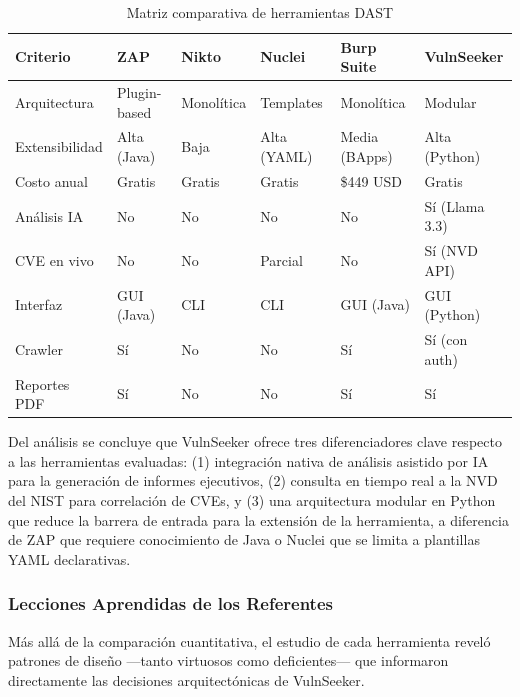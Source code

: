 \documentclass[12pt, a4paper]{article}
\begin{document}
\begin{table}[H]
    \centering
    \caption{Matriz comparativa de herramientas DAST}
    \label{tab:comparativa}
    \small
    \begin{tabular}{p{2.5cm} p{2cm} p{2cm} p{2cm} p{2cm} p{2.2cm}}
        \toprule
        \textbf{Criterio} & \textbf{ZAP} & \textbf{Nikto} & \textbf{Nuclei} &
        \textbf{Burp Suite} & \textbf{VulnSeeker} \\
        \midrule
        Arquitectura &
            Plugin-based & Monolítica & Templates & Monolítica &
            Modular \\
        Extensibilidad &
            Alta (Java) & Baja & Alta (YAML) & Media (BApps) &
            Alta (Python) \\
        Costo anual &
            Gratis & Gratis & Gratis & \$449 USD &
            Gratis \\
        Análisis IA &
            No & No & No & No &
            Sí (Llama 3.3) \\
        CVE en vivo &
            No & No & Parcial & No &
            Sí (NVD API) \\
        Interfaz &
            GUI (Java) & CLI & CLI & GUI (Java) &
            GUI (Python) \\
        Crawler &
            Sí & No & No & Sí &
            Sí (con auth) \\
        Reportes PDF &
            Sí & No & No & Sí &
            Sí \\
        \bottomrule
    \end{tabular}
\end{table}

Del análisis se concluye que VulnSeeker ofrece tres diferenciadores clave
respecto a las herramientas evaluadas: (1) integración nativa de análisis
asistido por IA para la generación de informes ejecutivos, (2) consulta en
tiempo real a la NVD del NIST para correlación de CVEs, y (3) una arquitectura
modular en Python que reduce la barrera de entrada para la extensión de la
herramienta, a diferencia de ZAP que requiere conocimiento de Java o Nuclei que
se limita a plantillas YAML declarativas.

\subsubsection{Lecciones Aprendidas de los Referentes}

Más allá de la comparación cuantitativa, el estudio de cada herramienta reveló
patrones de diseño ---tanto virtuosos como deficientes--- que informaron
directamente las decisiones arquitectónicas de VulnSeeker.
\end{document}
